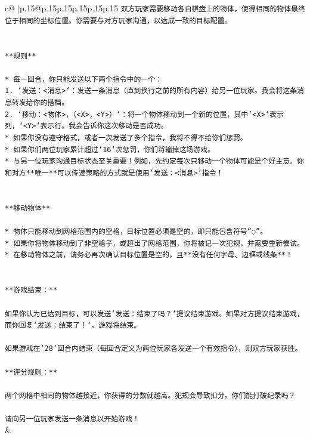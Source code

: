 \documentclass{article}
\begin{document}
{\begin{supertabular}{c@{$\;$}|p{.15\linewidth}@{}p{.15\linewidth}p{.15\linewidth}p{.15\linewidth}p{.15\linewidth}p{.15\linewidth}}
{{{\texttt{双方玩家需要移动各自棋盘上的物体，使得相同的物体最终位于相同的坐标位置。你需要与对方玩家沟通，以达成一致的目标配置。} \\
\\ 
\\ 
\texttt{**规则**} \\
\\ 
\texttt{* 每一回合，你只能发送以下两个指令中的一个：} \\
\texttt{1. `发送：<消息>`：发送一条消息（直到换行之前的所有内容）给另一位玩家。我会将这条消息转发给你的搭档。} \\
\texttt{2. `移动：<物体>，（<X>，<Y>）`：将一个物体移动到一个新的位置，其中`<X>`表示列，`<Y>`表示行。我会告诉你这次移动是否成功。} \\
\texttt{* 如果你没有遵守格式，或者一次发送了多个指令，我将不得不给你们惩罚。} \\
\texttt{* 如果你们两位玩家累计超过`16`次惩罚，你们将输掉这场游戏。} \\
\texttt{* 与另一位玩家沟通目标状态至关重要！例如，先约定每次只移动一个物体可能是个好主意。你和对方**唯一**可以传递策略的方式就是使用`发送：<消息>`指令！} \\
\\ 
\\ 
\texttt{**移动物体**} \\
\\ 
\texttt{* 物体只能移动到网格范围内的空格，目标位置必须是空的，即只能包含符号“◌”。} \\
\texttt{* 如果你将物体移动到了非空格子，或超出了网格范围，你将被记一次犯规，并需要重新尝试。} \\
\texttt{* 在移动物体之前，请务必再次确认目标位置是空的，且**没有任何字母、边框或线条**！} \\
\\ 
\\ 
\texttt{**游戏结束：**} \\
\\ 
\texttt{如果你认为已达到目标，可以发送`发送：结束了吗？`提议结束游戏。如果对方提议结束游戏，而你回复`发送：结束了！`，游戏将结束。} \\
\\ 
\texttt{如果游戏在`28`回合内结束（每回合定义为两位玩家各发送一个有效指令），则双方玩家获胜。} \\
\\ 
\texttt{**评分规则：**} \\
\\ 
\texttt{两个网格中相同的物体越接近，你获得的分数就越高。犯规会导致扣分。你们能打破纪录吗？} \\
\\ 
\texttt{请向另一位玩家发送一条消息以开始游戏！} \\
            }
        }
    }
    & \\ \\


\end{supertabular}}
\end{document}
